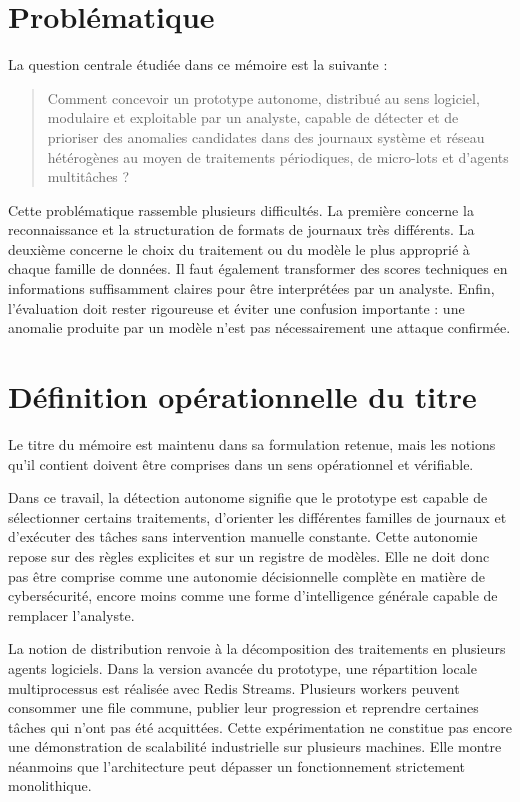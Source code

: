 \section{Problématique}

La question centrale étudiée dans ce mémoire est la suivante :

\begin{quote}
Comment concevoir un prototype autonome, distribué au sens logiciel, modulaire et exploitable par un analyste, capable de détecter et de prioriser des anomalies candidates dans des journaux système et réseau hétérogènes au moyen de traitements périodiques, de micro-lots et d'agents multitâches ?
\end{quote}

Cette problématique rassemble plusieurs difficultés. La première concerne la reconnaissance et la structuration de formats de journaux très différents. La deuxième concerne le choix du traitement ou du modèle le plus approprié à chaque famille de données. Il faut également transformer des scores techniques en informations suffisamment claires pour être interprétées par un analyste. Enfin, l'évaluation doit rester rigoureuse et éviter une confusion importante : une anomalie produite par un modèle n'est pas nécessairement une attaque confirmée.

\section{Définition opérationnelle du titre}

Le titre du mémoire est maintenu dans sa formulation retenue, mais les notions qu'il contient doivent être comprises dans un sens opérationnel et vérifiable.

Dans ce travail, la détection autonome signifie que le prototype est capable de sélectionner certains traitements, d'orienter les différentes familles de journaux et d'exécuter des tâches sans intervention manuelle constante. Cette autonomie repose sur des règles explicites et sur un registre de modèles. Elle ne doit donc pas être comprise comme une autonomie décisionnelle complète en matière de cybersécurité, encore moins comme une forme d'intelligence générale capable de remplacer l'analyste.

La notion de distribution renvoie à la décomposition des traitements en plusieurs agents logiciels. Dans la version avancée du prototype, une répartition locale multiprocessus est réalisée avec Redis Streams. Plusieurs workers peuvent consommer une file commune, publier leur progression et reprendre certaines tâches qui n'ont pas été acquittées. Cette expérimentation ne constitue pas encore une démonstration de scalabilité industrielle sur plusieurs machines. Elle montre néanmoins que l'architecture peut dépasser un fonctionnement strictement monolithique.

